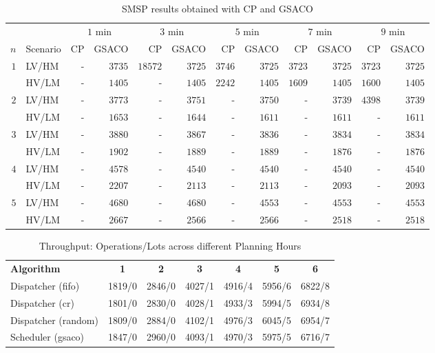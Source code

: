 \documentclass[runningheads]{llncs}
\begin{document}
\begin{table}[t]
	\caption{SMSP results obtained with CP and GSACO}\label{tab:results} \centering
	\begin{tabular}{|r|l|r|r|r|r|r|r|r|r|r|r|}
		\hline
		&
		&
		\multicolumn{2}{c}{$1$ min} &
		\multicolumn{2}{c}{$3$ min} &
		\multicolumn{2}{c}{$5$ min} &
		\multicolumn{2}{c}{$7$ min} &
		\multicolumn{2}{c}{$9$ min} \\ \cline{3-12} 
		$n$ & Scenario & CP & GSACO & CP & GSACO & CP & GSACO & CP & GSACO & CP & GSACO \\ \hline
		\multirow{2}{*}{$1$} & LV/HM & - & $3735$ & $18572$ & $3725$ & $3746$ & $3725$ & $3723$ & $3725$ & $3723$ & $3725$  \\
		& HV/LM & - & $1405$ & - & $1405$ & $2242$ & $1405$ & $1609$ & $1405$ & $1600$ & $1405$ \\
		\multirow{2}{*}{$2$} & LV/HM & - & $3773$ & - & $3751$ & - & $3750$ & - & $3739$ & $4398$ & $3739$ \\
		& HV/LM & - & $1653$ & - & $1644$ & - & $1611$ & - & $1611$ & - & $1611$   \\
		\multirow{2}{*}{$3$} & LV/HM & - & $3880$ & - & $3867$ & - & $3836$ & - & $3834$ & - & $3834$   \\
		& HV/LM & - & $1902$ & - & $1889$ & - & $1889$ & - & $1876$ & - & $1876$     \\
		\multirow{2}{*}{$4$} & LV/HM & - & $4578$ & - & $4540$ & - & $4540$ & - & $4540$ & - & $4540$     \\
		& HV/LM & - & $2207$ & - & $2113$ & - & $2113$ & - & $2093$ & - & $2093$  \\
		\multirow{2}{*}{$5$} & LV/HM & - & $4680$ & - & $4680$ & - & $4553$ & - & $4553$ & - & $4553$   \\	
		& HV/LM & - & $2667$ & - & $2566$ & - & $2566$ & - & $2518$ & - & $2518$ \\
		\hline  
	\end{tabular}
\end{table}


\begin{table}[t]
	\caption{Throughput: Operations/Lots across different Planning Hours} \label{tab:my_label} \centering
	\begin{tabular}{|l|c|c|c|c|c|c|}
		\hline
		\textbf{Algorithm} & \textbf{1} & \textbf{2} & \textbf{3} & \textbf{4} & \textbf{5} & \textbf{6} \\ \cline{1-7} 
		Dispatcher (fifo)   & 1819/0 & 2846/0 & 4027/1 & 4916/4 & 5956/6 & 6822/8 \\
		Dispatcher (cr)     & 1801/0 & 2830/0 & 4028/1 & 4933/3 & 5994/5 & 6934/8 \\
		Dispatcher (random) & 1809/0 & 2884/0 & 4102/1 & 4976/3 & 6045/5 & 6954/7 \\
		Scheduler (gsaco)   & 1847/0 & 2960/0 & 4093/1 & 4970/3 & 5975/5 & 6716/7 \\
		\hline 
	\end{tabular}
\end{table}
\end{document}
